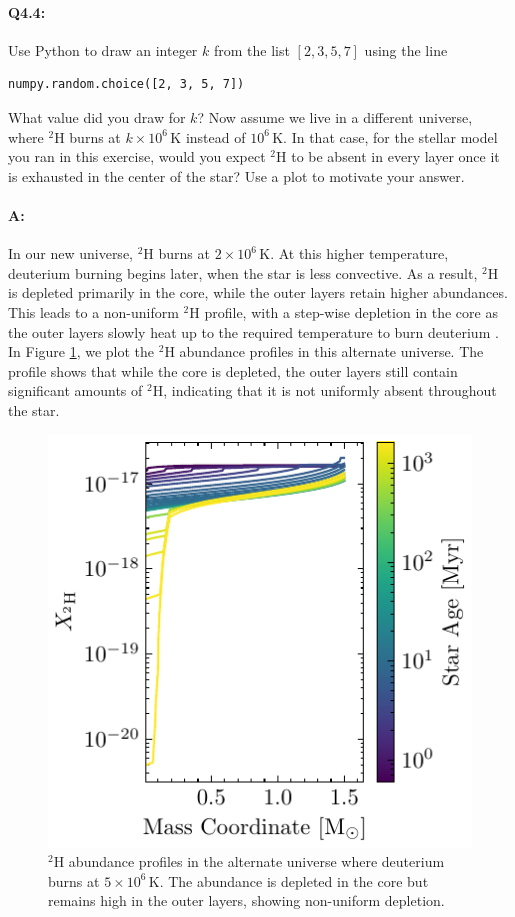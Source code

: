 \documentclass[twocolumn,fontsize=11pt]{scrartcl}
\begin{document}
\paragraph{Q4.4:} Use Python to draw an integer \(k\) from the list \([2, 3, 5, 7]\) using the line
\begin{verbatim}
numpy.random.choice([2, 3, 5, 7])
\end{verbatim}
What value did you draw for \(k\)? Now assume we live in a different universe, where \(^2\mathrm{H}\) burns at \(k \times 10^6\,\mathrm{K}\) instead of \(10^6\,\mathrm{K}\). In that case, for the stellar model you ran in this exercise, would you expect \(^2\mathrm{H}\) to be absent in every layer once it is exhausted in the center of the star? Use a plot to motivate your answer.

\paragraph{A:} In our new universe, \(^2\mathrm{H}\) burns at \(2 \times 10^6\,\mathrm{K}\). At this higher temperature, deuterium burning begins later, when the star is less convective. As a result, \(^2\mathrm{H}\) is depleted primarily in the core, while the outer layers retain higher abundances. This leads to a non-uniform \(^2\mathrm{H}\) profile, with a step-wise depletion in the core as the outer layers slowly heat up to the required temperature to burn deuterium . In Figure \ref{fig:q42_h2_profile_new_universe}, we plot the \(^2\mathrm{H}\) abundance profiles in this alternate universe. The profile shows that while the core is depleted, the outer layers still contain significant amounts of \(^2\mathrm{H}\), indicating that it is not uniformly absent throughout the star.

\begin{figure}[htbp]
    \centering
    \includegraphics{q42_h2_profile_new_universe.pdf}
    \caption{\(^2\mathrm{H}\) abundance profiles in the alternate universe where deuterium burns at \(5 \times 10^6\,\mathrm{K}\). The abundance is depleted in the core but remains high in the outer layers, showing non-uniform depletion.}
    \label{fig:q42_h2_profile_new_universe}
\end{figure}

\printbibliography
\end{document}
